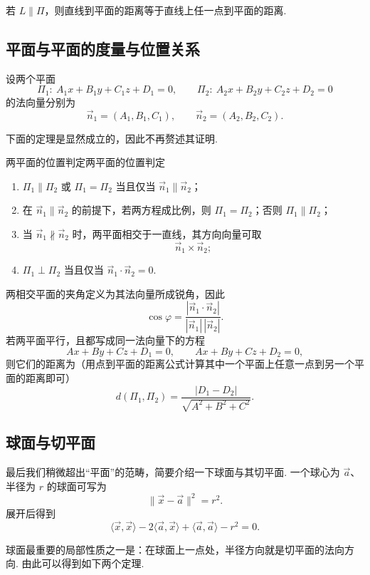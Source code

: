 若 $L \parallel \Pi$，则直线到平面的距离等于直线上任一点到平面的距离.

\subsection{平面与平面的度量与位置关系}

设两个平面
\[
    \Pi_1:\ A_1 x + B_1 y + C_1 z + D_1 = 0, \qquad
    \Pi_2:\ A_2 x + B_2 y + C_2 z + D_2 = 0
\]
的法向量分别为
\[
    \vec{n}_1 = (A_1, B_1, C_1), \qquad \vec{n}_2 = (A_2, B_2, C_2).
\]

下面的定理是显然成立的，因此不再赘述其证明.
\begin{theorem}{两平面的位置判定}{两平面的位置判定}
    \begin{enumerate}
        \item $\Pi_1 \parallel \Pi_2$ 或 $\Pi_1 = \Pi_2$ 当且仅当 $\vec{n}_1 \parallel \vec{n}_2$；
        \item 在 $\vec{n}_1 \parallel \vec{n}_2$ 的前提下，若两方程成比例，则 $\Pi_1 = \Pi_2$；否则 $\Pi_1 \parallel \Pi_2$；
        \item 当 $\vec{n}_1 \not\parallel \vec{n}_2$ 时，两平面相交于一直线，其方向向量可取
        \[
            \vec{n}_1 \times \vec{n}_2;
        \]
        \item $\Pi_1 \perp \Pi_2$ 当且仅当 $\vec{n}_1 \cdot \vec{n}_2 = 0$.
    \end{enumerate}
\end{theorem}

两相交平面的夹角定义为其法向量所成锐角，因此
\[
    \cos \varphi = \frac{|\vec{n}_1 \cdot \vec{n}_2|}{|\vec{n}_1|\,|\vec{n}_2|}.
\]
若两平面平行，且都写成同一法向量下的方程
\[
    A x + B y + C z + D_1 = 0, \qquad A x + B y + C z + D_2 = 0,
\]
则它们的距离为（用点到平面的距离公式计算其中一个平面上任意一点到另一个平面的距离即可）
\[
    d(\Pi_1, \Pi_2) = \frac{|D_1 - D_2|}{\sqrt{A^2 + B^2 + C^2}}.
\]

\subsection{球面与切平面}

最后我们稍微超出``平面''的范畴，简要介绍一下球面与其切平面. 一个球心为 $\vec{a}$、半径为 $r$ 的球面可写为
\[
    \|\vec{x} - \vec{a}\|^2 = r^2.
\]
展开后得到
\[
    \langle \vec{x}, \vec{x} \rangle - 2 \langle \vec{a}, \vec{x} \rangle + \langle \vec{a}, \vec{a} \rangle - r^2 = 0.
\]

球面最重要的局部性质之一是：在球面上一点处，半径方向就是切平面的法向方向. 由此可以得到如下两个定理.

